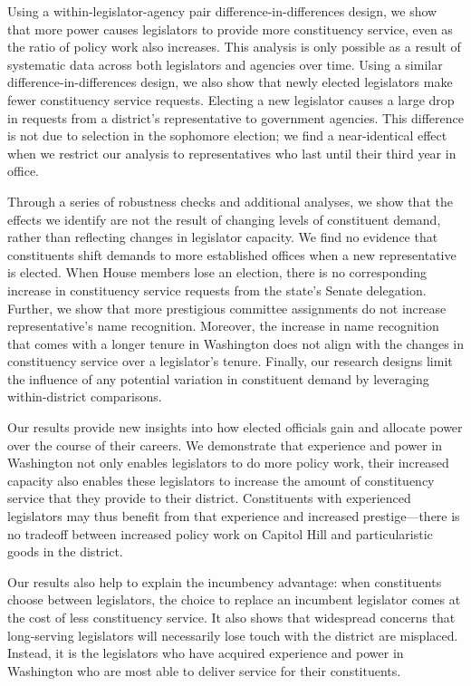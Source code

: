 \documentclass[12pt]{article}
\begin{document}
Using a within-legislator-agency pair difference-in-differences design, we show that more power causes legislators to provide more constituency service, even as the ratio of policy work also increases. This analysis is only possible as a result of systematic data across both legislators and agencies over time.  Using a similar difference-in-differences design, we also show that newly elected legislators make fewer constituency service requests. Electing a new legislator causes a large drop in requests from a district's representative to government agencies. This difference is not due to selection in the sophomore election; we find a near-identical effect when we restrict our analysis to representatives who last until their third year in office.

Through a series of robustness checks and additional analyses, we show that the effects we identify are not the result of changing levels of constituent demand, rather than reflecting changes in legislator capacity. We find no evidence that constituents shift demands to more established offices when a new representative is elected. When House members lose an election, there is no corresponding increase in constituency service requests from the state's Senate delegation. Further, we show that more prestigious committee assignments do not increase representative's name recognition. Moreover, the increase in name recognition that comes with a longer tenure in Washington does not align with the changes in constituency service over a legislator's tenure. Finally, our research designs limit the influence of any potential variation in constituent demand by leveraging within-district comparisons.  

Our results provide new insights into how elected officials gain and allocate power over the course of their careers. We demonstrate that experience and power in Washington not only enables legislators to do more policy work, their increased capacity also enables these legislators to increase the amount of constituency service that they provide to their district. Constituents with experienced legislators may thus benefit from that experience and increased prestige---there is no tradeoff between increased policy work on Capitol Hill and particularistic goods in the district. 

Our results also help to explain the incumbency advantage: when constituents choose between legislators, the choice to replace an incumbent legislator comes at the cost of less constituency service. It also shows that widespread concerns that long-serving legislators will necessarily lose touch with the district are misplaced. Instead, it is the legislators who have acquired experience and power in Washington who are most able to deliver service for their constituents.   
\end{document}
